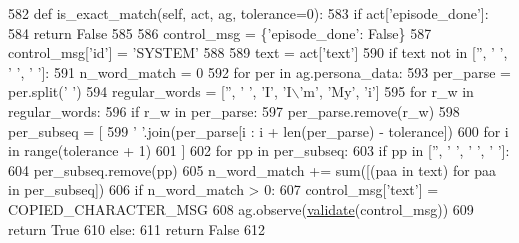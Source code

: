\begin{DoxyCode}
582     \textcolor{keyword}{def }is\_exact\_match(self, act, ag, tolerance=0):
583         \textcolor{keywordflow}{if} act[\textcolor{stringliteral}{'episode\_done'}]:
584             \textcolor{keywordflow}{return} \textcolor{keyword}{False}
585 
586         control\_msg = \{\textcolor{stringliteral}{'episode\_done'}: \textcolor{keyword}{False}\}
587         control\_msg[\textcolor{stringliteral}{'id'}] = \textcolor{stringliteral}{'SYSTEM'}
588 
589         text = act[\textcolor{stringliteral}{'text'}]
590         \textcolor{keywordflow}{if} text \textcolor{keywordflow}{not} \textcolor{keywordflow}{in} [\textcolor{stringliteral}{''}, \textcolor{stringliteral}{' '}, \textcolor{stringliteral}{'  '}, \textcolor{stringliteral}{'   '}]:
591             n\_word\_match = 0
592             \textcolor{keywordflow}{for} per \textcolor{keywordflow}{in} ag.persona\_data:
593                 per\_parse = per.split(\textcolor{stringliteral}{' '})
594                 regular\_words = [\textcolor{stringliteral}{''}, \textcolor{stringliteral}{' '}, \textcolor{stringliteral}{'I'}, \textcolor{stringliteral}{'I\(\backslash\)'m'}, \textcolor{stringliteral}{'My'}, \textcolor{stringliteral}{'i'}]
595                 \textcolor{keywordflow}{for} r\_w \textcolor{keywordflow}{in} regular\_words:
596                     \textcolor{keywordflow}{if} r\_w \textcolor{keywordflow}{in} per\_parse:
597                         per\_parse.remove(r\_w)
598                 per\_subseq = [
599                     \textcolor{stringliteral}{' '}.join(per\_parse[i : i + len(per\_parse) - tolerance])
600                     \textcolor{keywordflow}{for} i \textcolor{keywordflow}{in} range(tolerance + 1)
601                 ]
602                 \textcolor{keywordflow}{for} pp \textcolor{keywordflow}{in} per\_subseq:
603                     \textcolor{keywordflow}{if} pp \textcolor{keywordflow}{in} [\textcolor{stringliteral}{''}, \textcolor{stringliteral}{' '}, \textcolor{stringliteral}{'  '}, \textcolor{stringliteral}{'   '}]:
604                         per\_subseq.remove(pp)
605                 n\_word\_match += sum([(paa \textcolor{keywordflow}{in} text) \textcolor{keywordflow}{for} paa \textcolor{keywordflow}{in} per\_subseq])
606             \textcolor{keywordflow}{if} n\_word\_match > 0:
607                 control\_msg[\textcolor{stringliteral}{'text'}] = COPIED\_CHARACTER\_MSG
608                 ag.observe(\hyperlink{namespaceparlai_1_1core_1_1worlds_afc3fad603b7bce41dbdc9cdc04a9c794}{validate}(control\_msg))
609                 \textcolor{keywordflow}{return} \textcolor{keyword}{True}
610             \textcolor{keywordflow}{else}:
611                 \textcolor{keywordflow}{return} \textcolor{keyword}{False}
612 
\end{DoxyCode}
